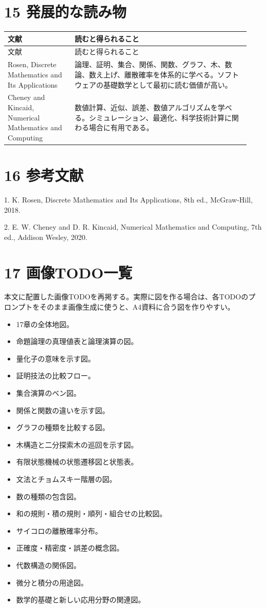 \documentclass[uplatex,dvipdfmx,a4paper,10pt]{jsarticle}
\begin{document}
\section{15 発展的な読み物}
\begin{longtable}{>{\raggedright\arraybackslash}p{0.26\linewidth} >{\raggedright\arraybackslash}p{0.68\linewidth}}
\toprule
文献 & 読むと得られること \\
\midrule
\endfirsthead
\toprule
文献 & 読むと得られること \\
\midrule
\endhead
Rosen, Discrete Mathematics and Its Applications & 論理、証明、集合、関係、関数、グラフ、木、数論、数え上げ、離散確率を体系的に学べる。ソフトウェアの基礎数学として最初に読む価値が高い。 \\
Cheney and Kincaid, Numerical Mathematics and Computing & 数値計算、近似、誤差、数値アルゴリズムを学べる。シミュレーション、最適化、科学技術計算に関わる場合に有用である。 \\
\bottomrule
\end{longtable}
\section{16 参考文献}
1. K. Rosen, Discrete Mathematics and Its Applications, 8th ed., McGraw-Hill, 2018.

2. E. W. Cheney and D. R. Kincaid, Numerical Mathematics and Computing, 7th ed., Addison Wesley, 2020.

\section{17 画像TODO一覧}
本文に配置した画像TODOを再掲する。実際に図を作る場合は、各TODOのプロンプトをそのまま画像生成に使うと、A4資料に合う図を作りやすい。

\begin{itemize}[leftmargin=2zw]
\item 17章の全体地図。
\item 命題論理の真理値表と論理演算の図。
\item 量化子の意味を示す図。
\item 証明技法の比較フロー。
\item 集合演算のベン図。
\item 関係と関数の違いを示す図。
\item グラフの種類を比較する図。
\item 木構造と二分探索木の巡回を示す図。
\item 有限状態機械の状態遷移図と状態表。
\item 文法とチョムスキー階層の図。
\item 数の種類の包含図。
\item 和の規則・積の規則・順列・組合せの比較図。
\item サイコロの離散確率分布。
\item 正確度・精密度・誤差の概念図。
\item 代数構造の関係図。
\item 微分と積分の用途図。
\item 数学的基礎と新しい応用分野の関連図。
\end{itemize}
\end{document}

